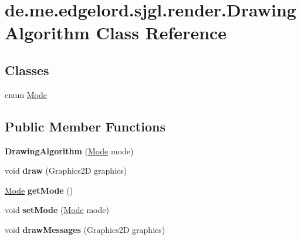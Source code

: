\hypertarget{classde_1_1me_1_1edgelord_1_1sjgl_1_1render_1_1_drawing_algorithm}{}\section{de.\+me.\+edgelord.\+sjgl.\+render.\+Drawing\+Algorithm Class Reference}
\label{classde_1_1me_1_1edgelord_1_1sjgl_1_1render_1_1_drawing_algorithm}
\subsection*{Classes}
\begin{DoxyCompactItemize}
\item 
enum \mbox{\hyperlink{enumde_1_1me_1_1edgelord_1_1sjgl_1_1render_1_1_drawing_algorithm_1_1_mode}{Mode}}
\end{DoxyCompactItemize}
\subsection*{Public Member Functions}
\begin{DoxyCompactItemize}
\item 
\mbox{\label{classde_1_1me_1_1edgelord_1_1sjgl_1_1render_1_1_drawing_algorithm_a28e191ba21d567d357d4e6119e5e3122}} 
{\bfseries Drawing\+Algorithm} (\mbox{\hyperlink{enumde_1_1me_1_1edgelord_1_1sjgl_1_1render_1_1_drawing_algorithm_1_1_mode}{Mode}} mode)
\item 
\mbox{\label{classde_1_1me_1_1edgelord_1_1sjgl_1_1render_1_1_drawing_algorithm_a9e572c3c0d4c3be8ca81a1c951fe3c1e}} 
void {\bfseries draw} (Graphics2D graphics)
\item 
\mbox{\label{classde_1_1me_1_1edgelord_1_1sjgl_1_1render_1_1_drawing_algorithm_a230b7cfbef359b8906693a6fe0d451e0}} 
\mbox{\hyperlink{enumde_1_1me_1_1edgelord_1_1sjgl_1_1render_1_1_drawing_algorithm_1_1_mode}{Mode}} {\bfseries get\+Mode} ()
\item 
\mbox{\label{classde_1_1me_1_1edgelord_1_1sjgl_1_1render_1_1_drawing_algorithm_a09aaada6d4907176b07436c3ee780e90}} 
void {\bfseries set\+Mode} (\mbox{\hyperlink{enumde_1_1me_1_1edgelord_1_1sjgl_1_1render_1_1_drawing_algorithm_1_1_mode}{Mode}} mode)
\item 
\mbox{\label{classde_1_1me_1_1edgelord_1_1sjgl_1_1render_1_1_drawing_algorithm_a5e71e044d007175a2707b67c5d26113f}} 
void {\bfseries draw\+Messages} (Graphics2D graphics)
\end{DoxyCompactItemize}
